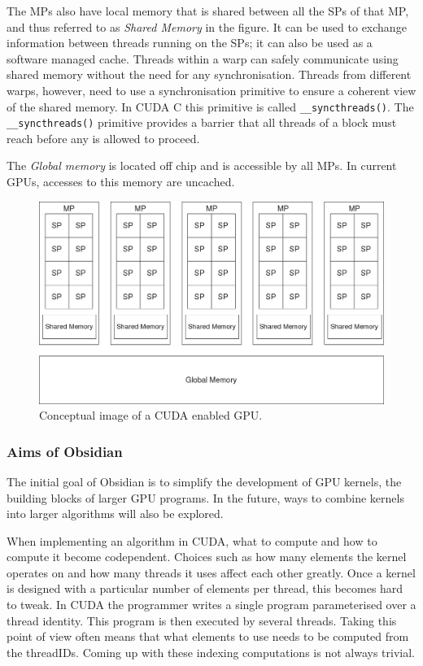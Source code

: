 The MPs also have local memory that is shared between all the 
SPs of that MP, and thus referred to as {\em Shared Memory} in the figure. 
It can be used to exchange information between threads running 
on the SPs; it can also be used as a software managed cache. 
Threads within a warp can safely communicate using shared memory without 
the need for any synchronisation. Threads from different warps, however, need 
to use a synchronisation primitive to ensure a coherent view of the shared 
memory. In CUDA C this primitive is called {\tt \_\_syncthreads()}. The
{\tt \_\_syncthreads()} primitive provides a barrier that all threads of a 
block must reach before any is allowed to proceed. 

The {\em Global memory} is located off chip and is accessible by all MPs. 
In current GPUs, accesses to this memory are uncached.


\begin{figure}
\begin{center}
\includegraphics[width=.65\linewidth]{./papp/pictures/gpu.jpg}
\caption{Conceptual image of a CUDA enabled GPU.}
\label{fig:gpu}
\end{center}
\end{figure}

\FloatBarrier

\subsubsection{Aims of Obsidian}

The initial goal of Obsidian is to simplify the development of GPU kernels, 
the building blocks of larger GPU programs. In the future, ways to combine 
kernels into larger algorithms will also be explored. 

When implementing an algorithm in CUDA, what to compute and how to compute it 
become codependent. Choices such as how many elements the kernel operates on 
and how many threads it uses affect each other greatly. Once a kernel 
is designed with a particular number of elements per thread, this becomes hard to tweak. In CUDA the programmer writes a single program 
parameterised over a thread identity. This program is then executed by 
several threads. Taking this point of view often means that what elements to use 
needs to be computed from the threadIDs. Coming up with these indexing 
computations is not always trivial. 

